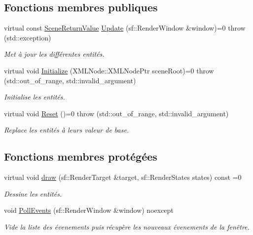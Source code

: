 \subsection*{Fonctions membres publiques}
\begin{DoxyCompactItemize}
\item 
virtual const \hyperlink{structmy_1_1SceneReturnValue}{Scene\+Return\+Value} \hyperlink{classmy_1_1Scene_ae9799de62a6daa9650e040f9f17c78df}{Update} (sf\+::\+Render\+Window \&window)=0  throw (std\+::exception)
\begin{DoxyCompactList}\small\item\em Met à jour les différentes entités. \end{DoxyCompactList}\item 
virtual void \hyperlink{classmy_1_1Scene_ac9401c5ec0e8a740fa338324a7df67a6}{Initialize} (X\+M\+L\+Node\+::\+X\+M\+L\+Node\+Ptr scene\+Root)=0  throw (std\+::out\+\_\+of\+\_\+range, std\+::invalid\+\_\+argument)
\begin{DoxyCompactList}\small\item\em Initialise les entités. \end{DoxyCompactList}\item 
\mbox{\label{classmy_1_1Scene_a0077c85b889247ef70d5b4b595bbfa76}} 
virtual void \hyperlink{classmy_1_1Scene_a0077c85b889247ef70d5b4b595bbfa76}{Reset} ()=0  throw (std\+::out\+\_\+of\+\_\+range, std\+::invalid\+\_\+argument)
\begin{DoxyCompactList}\small\item\em Replace les entités à leurs valeur de base. \end{DoxyCompactList}\end{DoxyCompactItemize}
\subsection*{Fonctions membres protégées}
\begin{DoxyCompactItemize}
\item 
\mbox{\label{classmy_1_1Scene_a1e3c785189d466d509f864e70303cbe1}} 
virtual void \hyperlink{classmy_1_1Scene_a1e3c785189d466d509f864e70303cbe1}{draw} (sf\+::\+Render\+Target \&target, sf\+::\+Render\+States states) const =0
\begin{DoxyCompactList}\small\item\em Dessine les entités. \end{DoxyCompactList}\item 
void \hyperlink{classmy_1_1Scene_a8e291c764cc4ca5c86c7ff803a7c40c8}{Poll\+Events} (sf\+::\+Render\+Window \&window) noexcept
\begin{DoxyCompactList}\small\item\em Vide la liste des évenements puis récupère les nouveaux évenements de la fenêtre. \end{DoxyCompactList}\end{DoxyCompactItemize}

